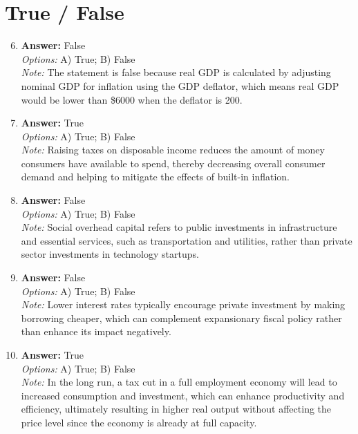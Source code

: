 \documentclass[12pt]{article}
\begin{document}
\section*{True / False}
\begin{enumerate}[label=\arabic*.]
\setcounter{enumi}{5}
\item \textbf{Answer:} False
\\ \textit{Options:} A) True; B) False
\\ \textit{Note:} The statement is false because real GDP is calculated by adjusting nominal GDP for inflation using the GDP deflator, which means real GDP would be lower than \$6000 when the deflator is 200.
\item \textbf{Answer:} True
\\ \textit{Options:} A) True; B) False
\\ \textit{Note:} Raising taxes on disposable income reduces the amount of money consumers have available to spend, thereby decreasing overall consumer demand and helping to mitigate the effects of built-in inflation.
\item \textbf{Answer:} False
\\ \textit{Options:} A) True; B) False
\\ \textit{Note:} Social overhead capital refers to public investments in infrastructure and essential services, such as transportation and utilities, rather than private sector investments in technology startups.
\item \textbf{Answer:} False
\\ \textit{Options:} A) True; B) False
\\ \textit{Note:} Lower interest rates typically encourage private investment by making borrowing cheaper, which can complement expansionary fiscal policy rather than enhance its impact negatively.
\item \textbf{Answer:} True
\\ \textit{Options:} A) True; B) False
\\ \textit{Note:} In the long run, a tax cut in a full employment economy will lead to increased consumption and investment, which can enhance productivity and efficiency, ultimately resulting in higher real output without affecting the price level since the economy is already at full capacity.
\end{enumerate}
\end{document}
